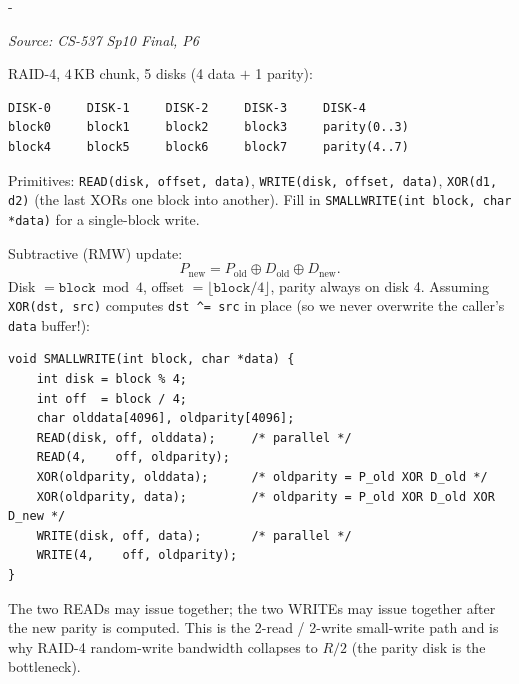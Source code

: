 \documentclass[11pt,a4paper]{article}
\makeatletter
\newcommand{\keepspace}[1]{\par\penalty-100\begingroup
  \setlength{\dimen@}{#1}\dimen@ii\pagegoal\advance\dimen@ii-\pagetotal
  \ifdim\dimen@>\dimen@ii\ifdim\dimen@ii>\z@\vfil\fi\break\fi\endgroup}
\newcounter{qn}[section]
\newenvironment{Qn}[4]{%
  \refstepcounter{qn}\keepspace{7\baselineskip}%
  \begin{tcolorbox}[qboxstyle, title={Q\thesection.\theqn\ \ [#1 \textbar\ #2]\ \ #4}]%
  {\footnotesize\color{g3}\textit{Source: #3}}\par\smallskip%
}{%
  \end{tcolorbox}%
}
\newenvironment{Sol}{%
  \begin{tcolorbox}[sboxstyle, title={Solution}]%
}{%
  \end{tcolorbox}\vspace{0.35em}%
}
\makeatother
\begin{document}
\begin{Qn}{Hard}{Lect 22A}{CS-537 Sp10 Final, P6}{RAID-4 SMALLWRITE with subtractive parity}
RAID-4, $4$\,KB chunk, 5 disks (4 data $+$ 1 parity):
\begin{lstlisting}[numbers=none]
DISK-0     DISK-1     DISK-2     DISK-3     DISK-4
block0     block1     block2     block3     parity(0..3)
block4     block5     block6     block7     parity(4..7)
\end{lstlisting}
Primitives: \texttt{READ(disk, offset, data)},
\texttt{WRITE(disk, offset, data)}, \texttt{XOR(d1, d2)}
(the last XORs one block into another). Fill in
\texttt{SMALLWRITE(int block, char *data)} for a single-block write.
\end{Qn}
\begin{Sol}
Subtractive (RMW) update:
\[
P_{\mathrm{new}} = P_{\mathrm{old}} \oplus D_{\mathrm{old}} \oplus D_{\mathrm{new}}.
\]
Disk $= \texttt{block} \bmod 4$, offset $= \lfloor\texttt{block}/4\rfloor$,
parity always on disk 4. Assuming \texttt{XOR(dst, src)} computes
\texttt{dst \textasciicircum= src} in place (so we never overwrite the caller's
\texttt{data} buffer!):
\begin{lstlisting}[numbers=none]
void SMALLWRITE(int block, char *data) {
    int disk = block % 4;
    int off  = block / 4;
    char olddata[4096], oldparity[4096];
    READ(disk, off, olddata);     /* parallel */
    READ(4,    off, oldparity);
    XOR(oldparity, olddata);      /* oldparity = P_old XOR D_old */
    XOR(oldparity, data);         /* oldparity = P_old XOR D_old XOR D_new */
    WRITE(disk, off, data);       /* parallel */
    WRITE(4,    off, oldparity);
}
\end{lstlisting}
The two READs may issue together; the two WRITEs may issue together
after the new parity is computed. This is the 2-read / 2-write small-write
path and is why RAID-4 random-write bandwidth collapses to $R/2$
(the parity disk is the bottleneck).
\end{Sol}
\end{document}
